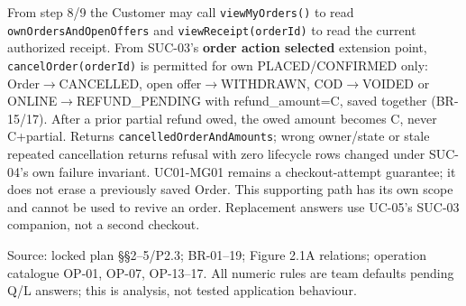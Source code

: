 From step 8/9 the Customer may call \texttt{viewMyOrders()} to read \texttt{ownOrdersAndOpenOffers} and \texttt{viewReceipt(orderId)} to read the current authorized receipt. From SUC-03's \textbf{order action selected} extension point, \texttt{cancelOrder(orderId)} is permitted for own PLACED/CONFIRMED only: Order\ensuremath{\rightarrow}CANCELLED, open offer\ensuremath{\rightarrow}WITHDRAWN, COD\ensuremath{\rightarrow}VOIDED or ONLINE\ensuremath{\rightarrow}REFUND\_PENDING with refund\_amount=C, saved together (BR-15/17). After a prior partial refund owed, the owed amount becomes C, never C+partial. Returns \texttt{cancelledOrderAndAmounts}; wrong owner/state or stale repeated cancellation returns refusal with zero lifecycle rows changed under SUC-04's own failure invariant. UC01-MG01 remains a checkout-attempt guarantee; it does not erase a previously saved Order. This supporting path has its own scope and cannot be used to revive an order. Replacement answers use UC-05's SUC-03 companion, not a second checkout.

Source: locked plan \S{}\S{}2--5/P2.3; BR-01--19; Figure 2.1A relations; operation catalogue OP-01, OP-07, OP-13--17. All numeric rules are team defaults pending Q/L answers; this is analysis, not tested application behaviour.
